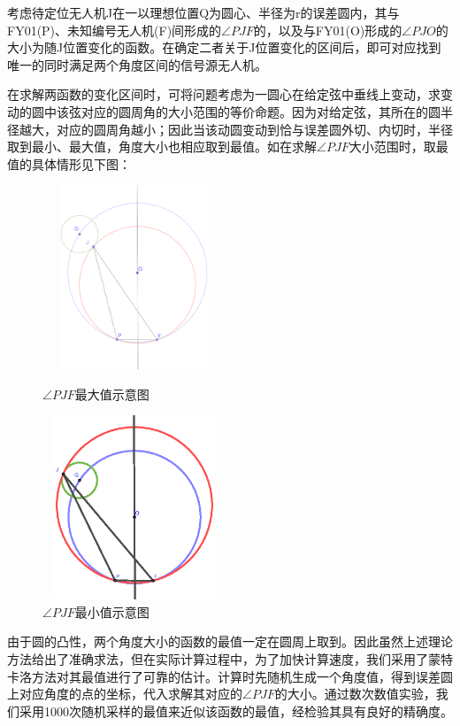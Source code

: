 \documentclass{ctexart}
\begin{document}
  考虑待定位无人机J在一以理想位置Q为圆心、半径为r的误差圆内，其与FY01(P)、未知编号无人机(F)间形成的$\angle PJF$的，以及与FY01(O)形成的$\angle PJO$的大小为随J位置变化的函数。在确定二者关于J位置变化的区间后，即可对应找到唯一的同时满足两个角度区间的信号源无人机。

在求解两函数的变化区间时，可将问题考虑为一圆心在给定弦中垂线上变动，求变动的圆中该弦对应的圆周角的大小范围的等价命题。因为对给定弦，其所在的圆半径越大，对应的圆周角越小；因此当该动圆变动到恰与误差圆外切、内切时，半径取到最小、最大值，角度大小也相应取到最值。如在求解$\angle PJF$大小范围时，取最值的具体情形见下图：

  \begin{figure}[htbp]
    \begin{minipage}[t]{0.45\linewidth}
    \centering
    \includegraphics[height=5.5cm,width=5.5cm]{pic/angle_max.eps}
    \caption{$\angle PJF$最大值示意图}
    \end{minipage}%
    \begin{minipage}[t]{0.45\linewidth}
    \centering
    \includegraphics[height=5.5cm,width=5.5cm]{pic/angle_min.eps}
    \caption{$\angle PJF$最小值示意图}
    \end{minipage}
    \end{figure}


由于圆的凸性，两个角度大小的函数的最值一定在圆周上取到。因此虽然上述理论方法给出了准确求法，但在实际计算过程中，为了加快计算速度，我们采用了蒙特卡洛方法对其最值进行了可靠的估计。计算时先随机生成一个角度值，得到误差圆上对应角度的点的坐标，代入求解其对应的$\angle PJF$的大小。通过数次数值实验，我们采用1000次随机采样的最值来近似该函数的最值，经检验其具有良好的精确度。
\end{document}
